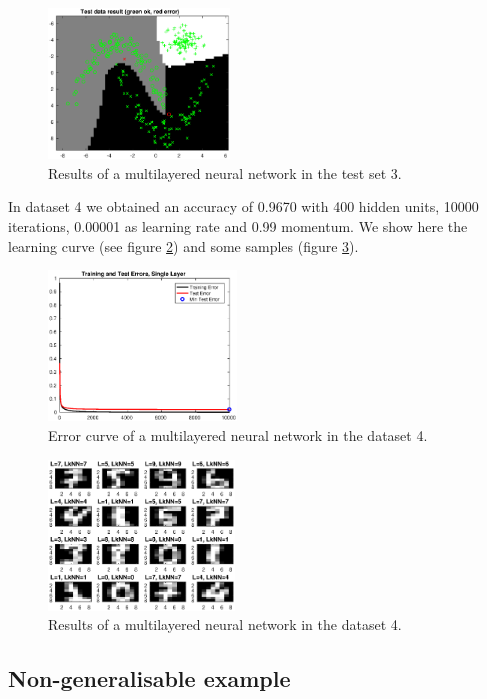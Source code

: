 \documentclass{article}
\begin{document}
\begin{figure}[H]
\centering
\includegraphics[height=4cm]{images/multi_data3_result_test}
\caption{Results of a multilayered neural network in the test set 3.}
\label{fig:multi_data3_result_test}
\end{figure}


In dataset 4 we obtained an accuracy of 0.9670 with 400 hidden units, 10000 iterations, 0.00001 as learning rate and 0.99 momentum. We show here the learning curve (see figure \ref{fig:multi_data4_error}) and some samples (figure \ref{fig:multi_data4_result}).

\begin{figure}[H]
\centering
\includegraphics[height=4cm]{images/multi_data4_error}
\caption{Error curve of a multilayered neural network in the dataset 4.}
\label{fig:multi_data4_error}
\end{figure}

\begin{figure}[H]
\centering
\includegraphics[height=4cm]{images/multi_data4_result}
\caption{Results of a multilayered neural network in the dataset 4.}
\label{fig:multi_data4_result}
\end{figure}


\subsection{Non-generalisable example}
\end{document}

